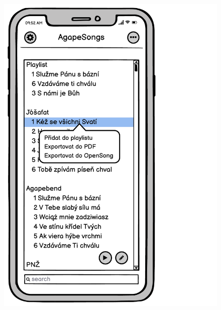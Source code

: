 \begin{figure}
    \includegraphics[width=\textwidth/3 - 2pt]{images/3-navrh/3-6-seznam-zpevniku-kontextove-menu.pdf}

\end{figure}
